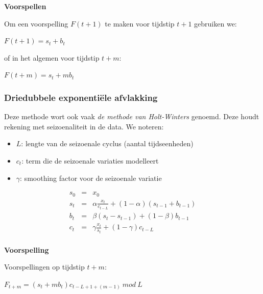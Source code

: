 \documentclass[a4paper,12pt]{article}
\begin{document}
\textbf{Voorspellen}

Om een voorspelling $F(t+1)$ te maken voor tijdstip $t+1$ gebruiken we:

$F(t+1) = s_t +b_t$

of in het algemen voor tijdstip $t+m$:

$F(t+m) = s_t + mb_t$

\subsubsection{Driedubbele exponentiële afvlakking}
Deze methode wort ook vaak \textit{de methode van Holt-Winters} genoemd.
Deze houdt rekening met seizoenaliteit in de data.
We noteren:
\begin{itemize}
\item $L$: lengte van de seizoenale cyclus (aantal tijdseenheden)
\item $c_t$: term die de seizoenale variaties modelleert
\item $\gamma$: smoothing factor voor de seizoenale variatie
\end{itemize}

\begin{equation}
\begin{array}{rcl}
s_0 & = & x_0\\
s_t & = & \alpha\frac{x_t}{c_{t-L}}+(1-\alpha)(s_{t-1}+b_{t-1})\\
b_t & = & \beta(s_t-s_{t-1})+(1-\beta)b_{t-1}\\
c_t & = & \gamma\frac{x_t}{s_t}+(1-\gamma)c_{t-L}\\
\end{array}
\end{equation}

\textbf{Voorspelling}

Voorspellingen op tijdstip $t+m$:

$F_{t+m}=(s_t+mb_t)c_{t-L+1+(m-1)}\:mod\:L$
\end{document}
